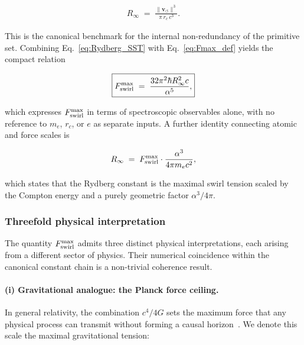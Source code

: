 \documentclass[11pt]{article}
\theoremstyle{definition}
\theoremstyle{plain}
\theoremstyle{remark}
\newcommand{\rc}{{r_c}}
\newcommand{\vnorm}{\lVert \mathbf{v}_{\!\boldsymbol{\circlearrowleft}} \rVert}
\begin{document}
        \begin{align}
            R_\infty \;=\; \frac{\vnorm^3}{\pi\,\rc\,c^3}.
            \label{eq:Rydberg_SST}
        \end{align}

        This is the canonical benchmark for the internal non-redundancy of the primitive set. Combining Eq.~\eqref{eq:Rydberg_SST} with Eq.~\eqref{eq:Fmax_def} yields the compact relation

        \begin{align}
            \boxed{
            F_{\rm swirl}^{\max}
            \;=\; \frac{32\pi^2\hbar R_\infty^2 c}{\alpha^5},
            }
            \label{eq:Fmax_Rydberg}
        \end{align}

        which expresses $F_{\rm swirl}^{\max}$ in terms of spectroscopic observables alone, with no reference to $m_e$, $\rc$, or $e$ as separate inputs. A further identity connecting atomic and force scales is

        \begin{align}
            R_\infty \;=\; F_{\rm swirl}^{\max} \cdot \frac{\alpha^3}{4\pi m_e c^2},
            \label{eq:Rydberg_Fmax}
        \end{align}

        which states that the Rydberg constant is the maximal swirl tension scaled by the Compton energy and a purely geometric factor $\alpha^3/4\pi$.

        \subsubsection{Threefold physical interpretation}

        The quantity $F_{\rm swirl}^{\max}$ admits three distinct physical interpretations, each arising from a different sector of physics. Their numerical coincidence within the canonical constant chain is a non-trivial coherence result.

        \paragraph{(i) Gravitational analogue: the Planck force ceiling.}

        In general relativity, the combination $c^4/4G$ sets the maximum force that any physical process can transmit without forming a causal horizon~\cite{Gibbons2002}. We denote this scale the maximal gravitational tension:
\end{document}

